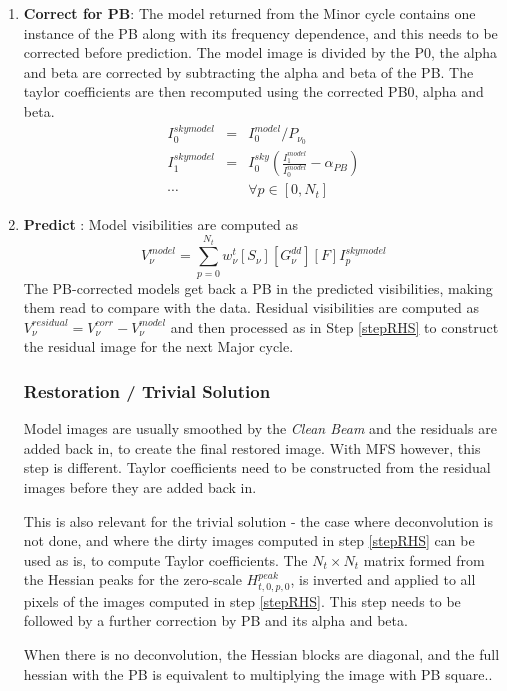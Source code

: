 \documentclass[structabstract]{aa}
\newcommand{\F}{{F}}
\newcommand{\G}{{G}}
\newcommand{\Sa}{{S}}
\newcommand{\Sna}{{S_{\nu}}}
\newcommand{\wnt}{{w_{\nu}^t}}
\newcommand{\Wnt}{{W^{mfs}_t}}
\begin{document}
\begin{enumerate}
\item\label{stepCorrectPB} {\bf Correct for PB}: 
The model returned from the Minor cycle contains one instance of the PB along with its
frequency dependence, and this needs to be corrected before prediction. 
The model image is divided by the P0, the alpha and beta are corrected by subtracting
the alpha and beta of the PB.  The taylor coefficients are then recomputed using the
corrected PB0, alpha and beta.
\begin{eqnarray}
I^{skymodel}_0 &=& I^{model}_0 / P_{\nu_0} \\
I^{skymodel}_1 &=& I^{sky}_0 \left(\frac{I^{model}_1}{I^{model}_0} - \alpha_{PB}\right)\\
\cdots & & \forall p\in[0,N_t]
\end{eqnarray}

\item\label{stepPredict} {\bf Predict }: Model visibilities are computed as 
\begin{equation}
V^{model}_{\nu} = \sum_{p=0}^{N_t} \wnt [\Sna] [\G_{\nu}^{{dd}}] [\F]I^{skymodel}_{p}
\end{equation}
The PB-corrected models get back a PB in the predicted visibilities, 
    making them read to compare with the data.
Residual visibilities are computed as $V_{\nu}^{residual} = V_{\nu}^{corr} - V_{\nu}^{model}$ and
then processed as in Step \ref{stepRHS} to construct the residual image for the next Major cycle.

\subsubsection{Restoration / Trivial Solution}
Model images are usually smoothed by the {\it Clean Beam} and the residuals are added back in, to
create the final restored image. With MFS however, this step is different. 
Taylor coefficients need to be constructed from the residual images before they are added back in.

This is also relevant for the trivial solution - 
the case where deconvolution is not done, and where the dirty images
computed in step \ref{stepRHS} can be used as is, to compute Taylor coefficients. 
The $N_t \times N_t$ matrix formed from the Hessian peaks for the zero-scale $H^{peak}_{t,0,p,0}$,
is inverted and applied to all pixels of the images computed in step \ref{stepRHS}.
This step needs to be followed by a further correction by PB and its alpha and beta.

When there is no deconvolution, the Hessian blocks are diagonal, and the full hessian with
the PB is equivalent to multiplying the image with PB square..

\end{enumerate}
\end{document}
